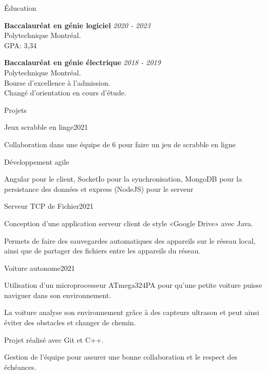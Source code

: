 \documentclass[french,12pt]{resume} %
\begin{document}
	\begin{rSection}{Éducation}
		
		{\bf Baccalauréat en génie logiciel} \hfill {\em  2020 - 2023} 
		\\ Polytechnique Montréal.
		\\GPA: 3,34 
		
		
		{\bf Baccalauréat en génie électrique} \hfill {\em  2018 - 2019} 
		\\ Polytechnique Montréal.
		\\ Bourse d'excellence à l'admission.
		\\ Changé d'orientation en cours d'étude.
		
	\end{rSection}
	
	
	\begin{rSection}{Projets}

		\begin{rSubsection}{Jeux scrabble en linge}{2021}{}{}
			\item   Collaboration dans une équipe de 6 pour faire un jeu de scrabble en ligne
			\item Développement agile
			\item Angular pour le client, SocketIo pour la synchronisation, MongoDB pour la persistance des données et express (NodeJS) pour le serveur
		\end{rSubsection}
		\begin{rSubsection}{Serveur TCP de Fichier}{2021}{}{}
			\item Conception d'une application serveur client de style «Google Drive» avec Java.
			\item Permets de faire des sauvegardes automatiques des appareils sur le réseau local, ainsi que de partager des fichiers entre les appareils du réseau.
		\end{rSubsection}
		 \begin{rSubsection}{Voiture autonome}{2021}{}{}
			\item Utilisation d'un microprocesseur ATmega324PA pour qu'une petite voiture puisse naviguer dans son environnement.
			\item La voiture analyse son environnement grâce à des capteurs ultrason et peut ainsi éviter des obstacles et changer de chemin.
			\item Projet réalisé avec Git et C++.
			\item Gestion de l'équipe pour assurer une bonne collaboration et le respect des échéances.
			 
		 \end{rSubsection}


		
	\end{rSection}
	
\end{document}

